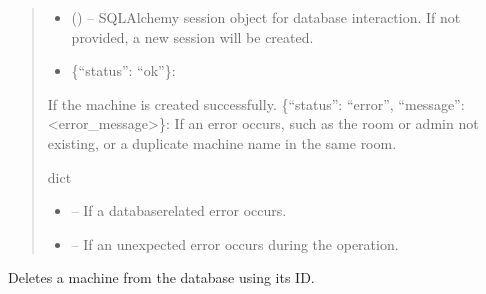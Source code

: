 \documentclass[letterpaper,10pt,english]{sphinxmanual}
\begin{document}
\begin{fulllineitems}
\begin{fulllineitems}
\begin{quote}
\begin{description}
\begin{itemize}
\item {} 
\sphinxAtStartPar
{} (\sphinxstyleliteralemphasis{\sphinxupquote{, }}) – SQLAlchemy session object for database interaction.
If not provided, a new session will be created.

\end{itemize}

\sphinxAtStartPar
\begin{description}
\begin{itemize}
\item {} 
\sphinxAtStartPar
\{“status”: “ok”\}:

\end{itemize}

\sphinxAtStartPar
If the machine is created successfully.
\sphinxhyphen{} \{“status”: “error”, “message”: <error\_message>\}:
If an error occurs, such as the room or admin not existing,
or a duplicate machine name in the same room.

\end{description}


\sphinxAtStartPar
dict

\begin{itemize}
\item {} 
\sphinxAtStartPar
{} – If a database\sphinxhyphen{}related error occurs.

\item {} 
\sphinxAtStartPar
{} – If an unexpected error occurs during the operation.

\end{itemize}

\end{description}\end{quote}

\end{fulllineitems}


\begin{fulllineitems}
\label{\detokenize{app.controllers:app.controllers.machine_controller.MachineController.deleteMachine}}
\pysigstartsignatures
\pysiglinewithargsret
{}
{\sphinxparamcomma {}}
{}
\pysigstopsignatures
\sphinxAtStartPar
Deletes a machine from the database using its ID.


\end{fulllineitems}
\end{fulllineitems}
\end{document}
